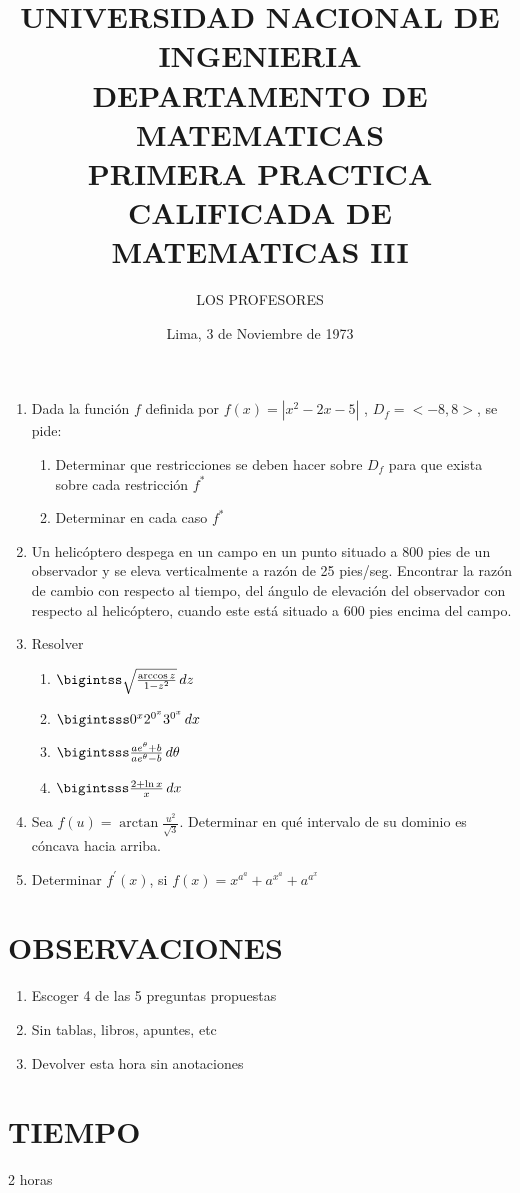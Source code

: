 \documentclass{exam}%
\title{UNIVERSIDAD NACIONAL DE INGENIERIA \\ DEPARTAMENTO DE MATEMATICAS \\ \large PRIMERA PRACTICA CALIFICADA DE MATEMATICAS III}
\author{LOS PROFESORES}
\date{Lima, 3 de Noviembre de 1973}
\begin{document}
\maketitle
{}
\begin{enumerate}
	\item Dada la función $f$ definida por $f(x)=|x^2-2x-5|$ , $D_f=<-8,8>$, se pide:
		\begin{enumerate}[label=\alph*)]
			\item Determinar que restricciones se deben hacer sobre $D_f$ para que exista sobre cada restricción $f^*$
			\item Determinar en cada caso $f^*$
		\end{enumerate}
	\item Un helicóptero despega en un campo en un punto situado a 800 pies de un observador y se eleva verticalmente a razón de 25 pies/seg. Encontrar la razón de cambio con respecto al tiempo, del ángulo de elevación del observador con respecto al helicóptero, cuando este está situado a 600 pies encima del campo.
	\item Resolver
		\begin{enumerate}[label=\alph*)]
			\item $\bigintss\sqrt{\frac{\arccos{z}}{1-z^2}}\,dz$
			\item $\bigintsss 0^{x}2^{0^x}3^{0^x}\,dx$
			\item $\bigintsss\frac{ae^\theta+b}{ae^\theta-b}\,d\theta$
			\item $\bigintsss\frac{2+\ln{x}}{x}\,dx$
		\end{enumerate}
	\item Sea $f(u)=\arctan{\frac{u^2}{\sqrt{3}}}$. Determinar en qué intervalo de su dominio es cóncava hacia arriba.
	\item Determinar $f^\prime (x)$, si $f(x)=x^{a^a}+a^{x^a}+a^{a^x}$
\end{enumerate}
\section*{OBSERVACIONES}
\begin{enumerate}
	\item Escoger 4 de las 5 preguntas propuestas
	\item Sin tablas, libros, apuntes, etc
	\item Devolver esta hora sin anotaciones
\end{enumerate}
\section*{TIEMPO}		
	2 horas
\end{document}

